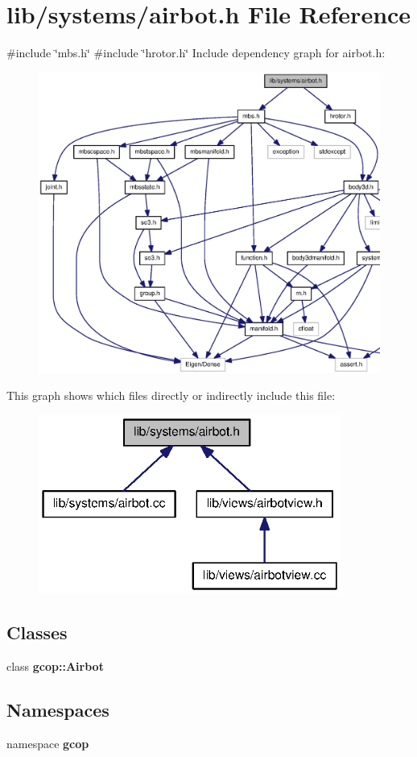 \section{lib/systems/airbot.h \-File \-Reference}
\label{airbot_8h}
{\ttfamily \#include \char`\"{}mbs.\-h\char`\"{}}\*
{\ttfamily \#include \char`\"{}hrotor.\-h\char`\"{}}\*
\-Include dependency graph for airbot.\-h\-:
\nopagebreak
\begin{figure}[H]
\begin{center}
\leavevmode
\includegraphics[width=350pt]{airbot_8h__incl}
\end{center}
\end{figure}
\-This graph shows which files directly or indirectly include this file\-:
\nopagebreak
\begin{figure}[H]
\begin{center}
\leavevmode
\includegraphics[width=281pt]{airbot_8h__dep__incl}
\end{center}
\end{figure}
\subsection*{\-Classes}
\begin{DoxyCompactItemize}
\item 
class {\bf gcop\-::\-Airbot}
\end{DoxyCompactItemize}
\subsection*{\-Namespaces}
\begin{DoxyCompactItemize}
\item 
namespace {\bf gcop}
\end{DoxyCompactItemize}
